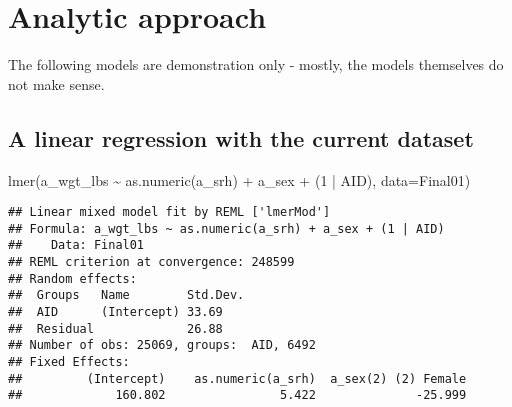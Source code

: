 \documentclass[
]{book}
\newenvironment{Shaded}{\begin{snugshade}}{\end{snugshade}}
\newcommand{\AttributeTok}[1]{\textcolor[rgb]{0.77,0.63,0.00}{#1}}
\newcommand{\DecValTok}[1]{\textcolor[rgb]{0.00,0.00,0.81}{#1}}
\newcommand{\FunctionTok}[1]{\textcolor[rgb]{0.00,0.00,0.00}{#1}}
\newcommand{\NormalTok}[1]{#1}
\newcommand{\SpecialCharTok}[1]{\textcolor[rgb]{0.00,0.00,0.00}{#1}}
\begin{document}
\hypertarget{analytic-approach}{%
\section{Analytic approach}\label{analytic-approach}}

The following models are demonstration only - mostly, the models themselves do not make sense.

\hypertarget{a-linear-regression-with-the-current-dataset}{%
\subsection{A linear regression with the current dataset}\label{a-linear-regression-with-the-current-dataset}}

\begin{Shaded}
\begin{Highlighting}[]
\FunctionTok{lmer}\NormalTok{(a\_wgt\_lbs }\SpecialCharTok{\textasciitilde{}} \FunctionTok{as.numeric}\NormalTok{(a\_srh) }\SpecialCharTok{+}\NormalTok{ a\_sex }\SpecialCharTok{+}\NormalTok{ (}\DecValTok{1} \SpecialCharTok{|}\NormalTok{ AID), }\AttributeTok{data=}\NormalTok{Final01)}
\end{Highlighting}
\end{Shaded}

\begin{verbatim}
## Linear mixed model fit by REML ['lmerMod']
## Formula: a_wgt_lbs ~ as.numeric(a_srh) + a_sex + (1 | AID)
##    Data: Final01
## REML criterion at convergence: 248599
## Random effects:
##  Groups   Name        Std.Dev.
##  AID      (Intercept) 33.69   
##  Residual             26.88   
## Number of obs: 25069, groups:  AID, 6492
## Fixed Effects:
##         (Intercept)    as.numeric(a_srh)  a_sex(2) (2) Female  
##             160.802                5.422              -25.999
\end{verbatim}

  
\end{document}

